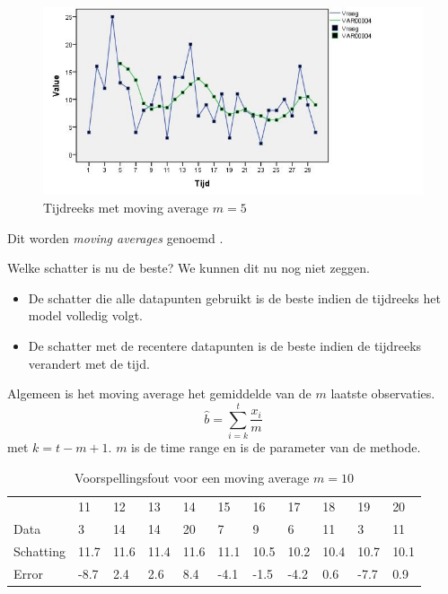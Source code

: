 \begin{figure}
	\centering
		\includegraphics[width=1.00\textwidth]{images/tijdsreeksen/tijdsreeks41.jpg}
	\caption{Tijdreeks met moving average $m = 5$}
	\label{fig:tijdreeks41}
\end{figure}



Dit worden \textit{moving averages} genoemd . 

Welke schatter is nu de beste? We kunnen dit nu nog niet zeggen. 
\begin{itemize}
	\item De schatter die alle datapunten gebruikt is de beste indien de tijdreeks het model volledig volgt.
	\item De schatter met de recentere datapunten is de beste indien de tijdreeks verandert met de tijd.
\end{itemize}

\begin{definition}
	Algemeen is het moving average het gemiddelde van de $m$ laatste observaties.
	\begin{equation}
		\widehat{b} = \sum_{i=k}^{t} \frac{x_{i}}{m}
	\label{eq:movingAverage}
	\end{equation}
	met $k = t-m+1$. $m$ is de time range en is de parameter van de methode.
\end{definition}


\begin{table}
    \begin{tabular}{|lllllllllll|}
    \hline
    ~         & 11   & 12   & 13   & 14   & 15   & 16   & 17   & 18   & 19   & 20   \\
    Data      & 3    & 14   & 14   & 20   & 7    & 9    & 6    & 11   & 3    & 11   \\
    Schatting & 11.7 & 11.6 & 11.4 & 11.6 & 11.1 & 10.5 & 10.2 & 10.4 & 10.7 & 10.1 \\
    Error     & -8.7 & 2.4  & 2.6  & 8.4  & -4.1 & -1.5 & -4.2 & 0.6  & -7.7 & 0.9  \\ \hline
    \end{tabular}
		\caption{Voorspellingsfout voor een moving average $m = 10$}
		\label{tab:error}
\end{table}

